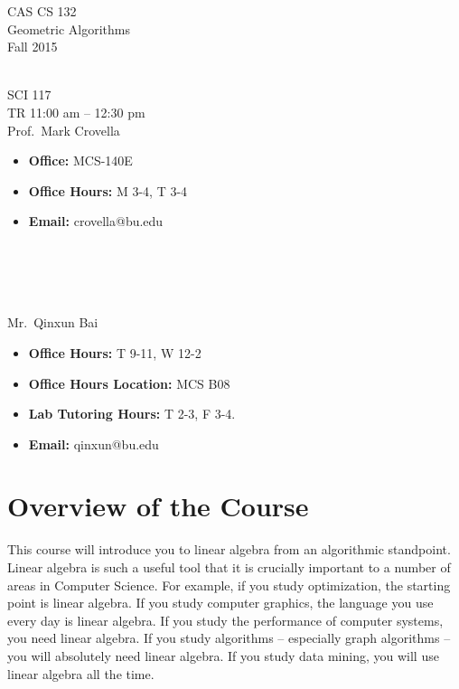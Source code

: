 \documentclass[11pt]{article}
\begin{document}
\sloppy 
\begin{center}
\LARGE CAS CS 132\\
\Large Geometric Algorithms\\
\Large\rm Fall 2015\\~\\
\end{center}

 SCI 117\\[\baselineskip]
 TR 11:00 am -- 12:30 pm 
\\[\baselineskip] 

 Prof.\ Mark Crovella\\[0.75\baselineskip]
\begin{minipage}[t]{0.60\textwidth}
\begin{itemize}
\item {\bf Office:} MCS-140E
\item {\bf Office Hours:} {\small M 3-4,  T 3-4}
\item {\bf Email:} crovella@bu.edu
\end{itemize}
\end{minipage}
~\\~\\~\\~\\
  Mr.\ Qinxun Bai\\[0.75\baselineskip]
 \begin{minipage}[t]{0.60\textwidth}
 \begin{itemize}
 \item {\bf Office Hours:} {\small T 9-11, W 12-2}
 \item {\bf Office Hours Location:} MCS B08
 \item {\bf Lab Tutoring Hours:} {\small T 2-3, F 3-4.}
 \item {\bf Email:} qinxun@bu.edu
 \end{itemize}
 \end{minipage}

\section*{Overview of the Course}

This course will introduce you to linear algebra from an algorithmic
standpoint.  Linear algebra is such a useful tool that it is crucially
important to a number of areas in Computer Science. For example, if you study
optimization, the starting point is linear algebra. If you study
computer graphics, the language you use every day is linear algebra. If
you study the performance of computer systems, you need linear
algebra. If you study algorithms -- especially graph algorithms -- you
will absolutely need linear algebra. If you study data mining, you will
use linear algebra all the time. 
\end{document}
